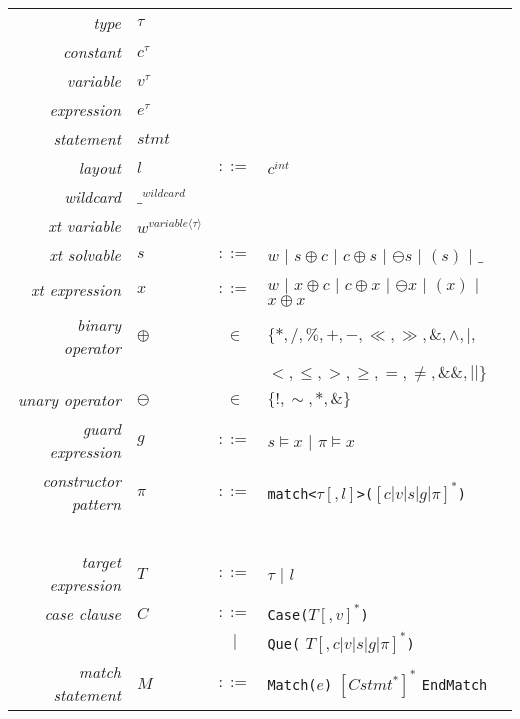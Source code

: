 \documentclass[preprint]{sigplanconf}
\DeclareRobustCommand{\code}[1]{{\lstinline[breaklines=false]{#1}}}
\newcommand{\Rule}[1]{{\rmfamily\itshape{#1}}}
\newcommand{\Alt}{\ensuremath{|}}
\newcommand{\is}{$::=$}
\begin{document}
\begin{center}
\begin{tabular}{rp{0em}cl}
\Rule{type}                & $\tau$  &        & \ \\
\Rule{constant}            & $c^\tau$&        & \ \\
\Rule{variable}            & $v^\tau$&        & \ \\
\Rule{expression}          & $e^\tau$&        & \ \\
\Rule{statement}           & $stmt$  &        & \ \\
\Rule{layout}              & $l$     & \is{}  & $c^{int}$ \\
\Rule{wildcard}            & $\_^{wildcard}$& & \ \\
\Rule{xt variable}         & $w^{variable\langle\tau\rangle}$ & & \ \\
\Rule{xt solvable}         & $s$     & \is{}  & $w$ \Alt{} $s \oplus c$ \Alt{} $c \oplus s$ \Alt{} $\ominus s$ \Alt{} $(s)$ \Alt{} $\_$ \\
\Rule{xt expression}       & $x$     & \is{}  & $w$ \Alt{} $x \oplus c$ \Alt{} $c \oplus x$ \Alt{} $\ominus x$ \Alt{} $(x)$ \Alt{} $x \oplus x$ \\
\Rule{binary operator}     & $\oplus$& $\in$  & $\lbrace*,/,\%,+,-,\ll,\gg,\&,\wedge,|,$ \\
                           &         &        & $<,\leq,>,\geq,=,\neq,\&\&,||\rbrace$ \\
\Rule{unary operator}      &$\ominus$& $\in$  & $\lbrace!,\sim,*,\&\rbrace$ \\
\Rule{guard expression}    & $g$     & \is{}  & $s \models x$ \Alt{} $\pi \models x$ \\
\Rule{constructor pattern} & $\pi$   & \is{}  & \code{match<}$\tau\left[,l\right]$\code{>(}$\left[c|v|s|g|\pi\right]^*$\code{)} \\
                           &         &        & \ \\
\Rule{target expression}   & $T$     & \is{}  & $\tau$ \Alt{} $l$ \\
\Rule{case clause}         & $C$     & \is{}  & \code{Case(}$T\left[,v\right]^*$\code{)} \\
                           &         & \Alt{} & \code{Que(} $T\left[,c|v|s|g|\pi\right]^*$\code{)} \\
\Rule{match statement}     & $M$     & \is{}  & \code{Match(}$e$\code{)} $\left[C stmt^*\right]^*$ \code{EndMatch} \\
\end{tabular}
\end{center}
\end{document}
